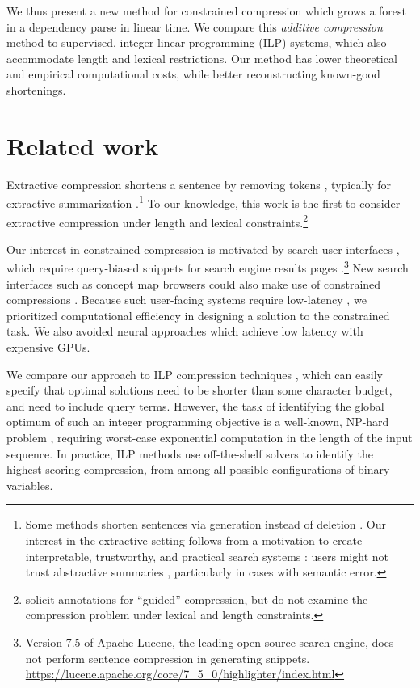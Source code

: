 \documentclass[11pt,a4paper]{article}
\begin{document}
We thus present a new method for constrained compression which grows a forest in a dependency parse in linear time. We compare this \textit{additive compression} method to supervised, integer linear programming (ILP) systems, which also accommodate length and lexical restrictions. Our method has lower theoretical and empirical computational costs, while better reconstructing known-good shortenings. 

\section{Related work}\label{s:relatedwork}

Extractive compression shortens a sentence by removing tokens \cite{Knight2000StatisticsBasedS,clarke2008global,filippova2015sentence,Wang2017CanSH}, typically for extractive summarization \cite{Knight2000StatisticsBasedS,almeida2013fast,P16-1188}.\footnote{Some methods shorten sentences via generation instead of deletion \cite{rush2015neural,mallinson18}. Our interest in the extractive setting follows from a motivation to create interpretable,  trustworthy, and practical search systems \cite{Chuang2012InterpretationAT}: users might not trust abstractive summaries \cite{Zhang:2018:MSG:3290265.3274465}, particularly in cases with semantic error.} To our knowledge, this work is the first to consider extractive compression under length and lexical constraints.\footnote{\citet{Li2013DocumentSV} solicit annotations for ``guided'' compression, but do not examine the compression problem under lexical and length constraints.}

Our interest in constrained compression is motivated by search user interfaces \cite{hearst2009search}, which require query-biased snippets for search engine results pages \cite{tombros1998advantages}.\footnote{Version 7.5 of Apache Lucene, the leading open source search engine, does not perform sentence compression in generating snippets. \url{https://lucene.apache.org/core/7_5_0/highlighter/index.html}} New search interfaces such as concept map browsers could also make use of constrained compressions \cite{marchionini2006exploratory,emnlp2017conceptmaps}. Because such user-facing systems require low-latency \cite{Nielsen,heerschei,Liu2014TheEO}, we prioritized computational efficiency in designing a solution to the constrained task. We also avoided neural approaches which achieve low latency with expensive GPUs.

We compare our approach to ILP compression techniques \cite{clarke2008global,filippova2008dependency,filippova2013overcoming,Wang2017CanSH}, which can easily specify that optimal solutions need to be shorter than some character budget, and need to include query terms. However, the task of identifying the global optimum of such an integer programming objective is a well-known, NP-hard problem \cite{clarke2008global}, requiring worst-case exponential computation in the length of the input sequence. In practice, ILP methods use off-the-shelf solvers to identify the highest-scoring compression, from among all possible configurations of binary variables. 
\end{document}
